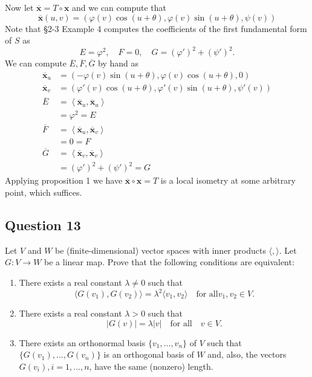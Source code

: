 \documentclass[12pt]{article}
\begin{document}
Now let \(\overline{\mathbf{x}} = T\circ\mathbf{x}\) and we can compute that
\[ \overline{\mathbf{x}}(u,v) = (\varphi(v)\cos(u+\theta), \varphi(v)\sin(u+\theta), \psi(v)) \]
Note that §2-3 Example 4 computes the coefficients of the first fundamental form of \(S\) as
\[ E = \varphi^2,\quad F = 0,\quad G = (\varphi')^2 + (\psi')^2. \]
We can compute \(\overline{E},\overline{F},\overline{G}\) by hand as
\begin{align*}
    \overline{\mathbf{x}}_u &= (-\varphi(v)\sin(u+\theta),\varphi(v)\cos(u+\theta), 0) \\
    \overline{\mathbf{x}}_v &= (\varphi'(v)\cos(u+\theta),\varphi'(v)\sin(u+\theta), \psi'(v)) \\
    \overline{E} &= \left\langle \overline{\mathbf{x}}_u, \overline{\mathbf{x}}_u \right\rangle \\
                 &= \varphi^2 = E\\
    \overline{F} &= \left\langle \overline{\mathbf{x}}_u, \overline{\mathbf{x}}_v \right\rangle \\
                 &= 0 = F \\
    \overline{G} &= \left\langle \overline{\mathbf{x}}_v, \overline{\mathbf{x}}_v \right\rangle \\
                 &= (\varphi')^2 + (\psi')^2 = G
\end{align*}
Applying proposition 1 we have \(\overline{\mathbf{x}}\circ\mathbf{x} = T\) is a local isometry at some arbitrary point, which suffices.

\subsection*{Question 13}
Let $V$ and $W$ be (finite-dimensional) vector spaces with inner products $\langle ,\rangle$. Let $G: V \to W$ be a linear map. Prove that the following conditions are equivalent:
\begin{enumerate}
    \item There exists a real constant $\lambda \neq 0$ such that \begin{equation*}
        \langle G(v_1), G(v_2)\rangle = \lambda^2\langle v_1, v_2\rangle \quad \text{for all} v_1,v_2 \in V.
    \end{equation*}
    \item There exists a real constant $\lambda>0$ such that \begin{equation*}
        |G(v)| = \lambda |v|\quad \text{for all}\quad v \in V.
    \end{equation*}
    \item There exists an orthonormal basis $\{v_1,\dots,v_n\}$ of $V$ such that $\{G(v_1),...,G(v_n)\}$ is an orthogonal basis of $W$ and, also, the vectors $G(v_i), i = 1, ...,n$, have the same (nonzero) length.
\end{enumerate}
\end{document}
